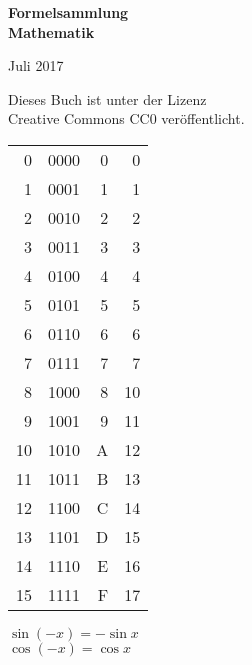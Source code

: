 \documentclass[a4paper,10pt,fleqn,twocolumn,twoside,openany]{book}
\numberwithin{equation}{chapter}
\newenvironment{ttsection}{\ttfamily}{\par}
\begin{document}
\setlength{\abovedisplayskip}{6pt}
\setlength{\belowdisplayskip}{6pt}
\setlength{\abovedisplayshortskip}{6pt}
\setlength{\belowdisplayshortskip}{6pt}

\begin{titlepage}
\centering
\phantom{x}

\vspace{20em}
{\noindent\Huge\sffamily\textbf{Formelsammlung\\
Mathematik}}

\vspace{2em}
{\Large Juli 2017}\\
\end{titlepage}

\thispagestyle{empty}

\noindent
Dieses Buch ist unter der Lizenz\\
Creative Commons CC0 veröffentlicht.
\vspace{8em}

\noindent
\begin{ttsection}
\begin{tabular}{r|r|r|r}
 0 & 0000 & 0 &  0\\
 1 & 0001 & 1 &  1\\
 2 & 0010 & 2 &  2\\
 3 & 0011 & 3 &  3\\
\noalign{\vspace{1em}}
 4 & 0100 & 4 &  4\\
 5 & 0101 & 5 &  5\\
 6 & 0110 & 6 &  6\\
 7 & 0111 & 7 &  7\\
\noalign{\vspace{1em}}
 8 & 1000 & 8 & 10\\
 9 & 1001 & 9 & 11\\
10 & 1010 & A & 12\\
11 & 1011 & B & 13\\
\noalign{\vspace{1em}}
12 & 1100 & C & 14\\
13 & 1101 & D & 15\\
14 & 1110 & E & 16\\
15 & 1111 & F & 17
\end{tabular}
\end{ttsection}

\newpage
\noindent
$\sin(-x) = -\sin x$\\
$\cos(-x) = \cos x$
\vspace{1em}
\end{document}
